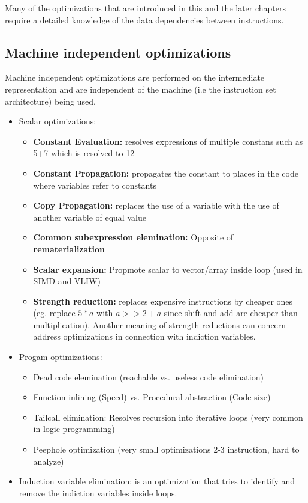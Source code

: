 \documentclass[a4paper,10pt]{article}
\begin{document}
Many of the optimizations that are introduced in this and the later chapters require a detailed knowledge of the data dependencies between 
instructions.

\subsection{Machine independent optimizations}
Machine independent optimizations are performed on the intermediate representation and are independent of the machine (i.e the instruction 
set architecture) being used.
\begin{itemize}
 \item Scalar optimizations:
 \begin{itemize}
     \item \textbf{Constant Evaluation:} resolves expressions of multiple constans such as 5+7 which is resolved to 12
     \item \textbf{Constant Propagation:} propagates the constant to places in the code where variables refer to constants
     \item \textbf{Copy Propagation:} replaces the use of a variable with the use of another variable of equal value
     \item \textbf{Common subexpression elemination:} Opposite of \textbf{rematerialization}
     \item \textbf{Scalar expansion:} Propmote scalar to vector/array inside loop (used in SIMD and VLIW)
     \item \textbf{Strength reduction:} replaces expensive instructions by cheaper ones (eg. replace $5*a$ with $a>>2+a$ since shift and add are cheaper than multiplication). Another meaning of strength reductions can concern address optimizations in connection with indiction variables.
 \end{itemize}
 \item Progam optimizations:
 \begin{itemize}
     \item Dead code elemination (reachable vs. useless code elimination)
     \item Function inlining (Speed) vs. Procedural abstraction (Code size)
     \item Tailcall elimination: Resolves recursion into iterative loops (very common in logic programming)
     \item Peephole optimization (very small optimizations 2-3 instruction, hard to analyze)
 \end{itemize}
 \item Induction variable elimination: is an optimization that tries to identify and remove the indiction variables inside loops.

\end{itemize}
\end{document}
